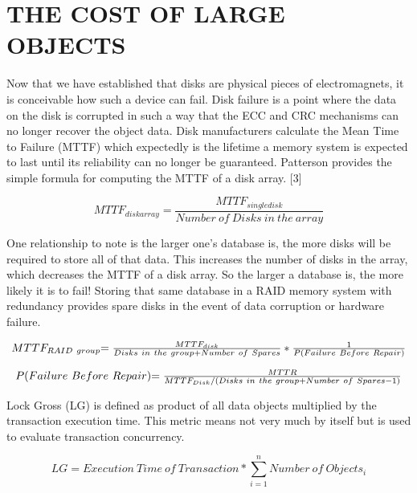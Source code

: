 \documentclass[letterpaper, 10 pt, conference]{ieeeconf}
\begin{document}
\section{THE COST OF LARGE OBJECTS}
Now that we have established that disks are physical pieces of electromagnets, it is conceivable how such a device can fail.  Disk failure is a point where the data on the disk is corrupted in such a way that the ECC and CRC mechanisms can no longer recover the object data.  Disk manufacturers calculate the Mean Time to Failure (MTTF) which expectedly is the lifetime a memory system is expected to last until its reliability can no longer be guaranteed.  Patterson provides the simple formula for computing the MTTF of a disk array. [3]

\begin{equation}
MTTF_{disk array} = \frac{MTTF_{single disk}}{Number\ of\ Disks\ in\ the\ array}
\end{equation}

One relationship to note is the larger one’s database is, the more disks will be required to store all of that data.  This increases the number of disks in the array, which decreases the MTTF of a disk array.  So the larger a database is, the more likely it is to fail!  Storing that same database in a RAID memory system with redundancy provides spare disks in the event of data corruption or hardware failure.
 


\begin{equation}
$$MTTF_{RAID\ group}$$ = \frac{MTTF_{disk}}{Disks\ in\ the\ group + Number\ of\ Spares} 
* \frac{1}{P(Failure\ Before\ Repair)}
\end{equation}

\begin{equation}
$$P(Failure\ Before\ Repair)$$ = \frac{MTTR}{MTTF_{Disk} / (Disks\ in\ the\ group + Number\ of\ Spares - 1)}
\end{equation}

Lock Gross (LG) is defined as product of all data objects multiplied by the transaction execution time.  This metric means not very much by itself but is used to evaluate transaction concurrency.
 
\begin{equation}
LG = Execution\ Time\ of\ Transaction * \sum_{i=1}^{n}{Number\ of\ Objects_i}
\end{equation}
 
\end{document}
